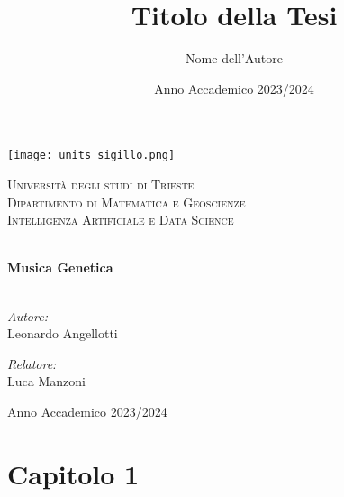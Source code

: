 \documentclass[a4paper,12pt]{report}
\title{Titolo della Tesi}
\author{Nome dell'Autore}
\date{Anno Accademico 2023/2024}
\begin{document}
\begin{titlepage}
    \begin{center}
        \texttt{[image: units\_sigillo.png]} %
        \vspace{1cm}
        
        \textsc{\LARGE Università degli studi di Trieste}\\[1.5cm]
        
        \textsc{\Large Dipartimento di Matematica e Geoscienze}\\[0.5cm]
        
        \textsc{\large Intelligenza Artificiale e Data Science}\\[0.5cm]
        
        \vspace{2cm}
        
        \HRule \\[0.4cm]
        { \huge \bfseries Musica Genetica \\[0.4cm] }
        \HRule \\[1.5cm]
        
        \vspace{2cm}
        
        \begin{minipage}{0.4\textwidth}
            \begin{flushleft} \large
                \emph{Autore:}\\
                Leonardo Angellotti
            \end{flushleft}
        \end{minipage}
        \begin{minipage}{0.4\textwidth}
            \begin{flushright} \large
                \emph{Relatore:} \\
                Luca Manzoni
            \end{flushright}
        \end{minipage}
        
        \vfill
        
        {\large Anno Accademico 2023/2024}
        
    \end{center}
\end{titlepage}

\chapter*{Capitolo 1}
\end{document}
